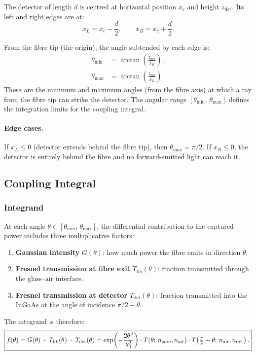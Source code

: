 The detector of length $d$ is centred at horizontal position $x_c$
and height $z_\text{det}$.  Its left and right edges are at:
%
\begin{equation}
  x_L = x_c - \frac{d}{2}, \qquad x_R = x_c + \frac{d}{2}.
\end{equation}

From the fibre tip (the origin), the angle subtended by each edge is:
%
\begin{align}
  \theta_\text{min} &= \arctan\!\left(\frac{z_\text{det}}{x_R}\right),
  \label{eq:thmin} \\
  \theta_\text{max} &= \arctan\!\left(\frac{z_\text{det}}{x_L}\right).
  \label{eq:thmax}
\end{align}
%
These are the minimum and maximum angles (from the fibre axis) at which
a ray from the fibre tip can strike the detector.  The angular range
$[\theta_\text{min},\, \theta_\text{max}]$ defines the integration
limits for the coupling integral.

\paragraph{Edge cases.}
If $x_L \leq 0$ (detector extends behind the fibre tip), then
$\theta_\text{max} = \pi/2$.  If $x_R \leq 0$, the detector is
entirely behind the fibre and no forward-emitted light can reach it.

\subsection{Coupling Integral}

\subsubsection{Integrand}

At each angle $\theta \in [\theta_\text{min},\,\theta_\text{max}]$,
the differential contribution to the captured power includes three
multiplicative factors:
%
\begin{enumerate}[label=\arabic*.]
  \item \textbf{Gaussian intensity} $G(\theta)$: how much power the
        fibre emits in direction $\theta$.
  \item \textbf{Fresnel transmission at fibre exit} $T_\text{fib}(\theta)$:
        fraction transmitted through the glass--air interface.
  \item \textbf{Fresnel transmission at detector} $T_\text{det}(\theta)$:
        fraction transmitted into the InGaAs at the angle of incidence
        $\pi/2 - \theta$.
\end{enumerate}
%
The integrand is therefore:
%
\begin{equation}\label{eq:integrand}
  \boxed{%
    f(\theta)
    = G(\theta)\;\cdot\;T_\text{fib}(\theta)\;\cdot\;T_\text{det}(\theta)
    = \exp\!\left(-\frac{2\theta^2}{\theta_0^2}\right)
      \cdot T(\theta;\,n_\text{core},n_\text{air})
      \cdot T\!\left(\tfrac{\pi}{2}-\theta;\,n_\text{air},n_\text{det}\right).
  }
\end{equation}

